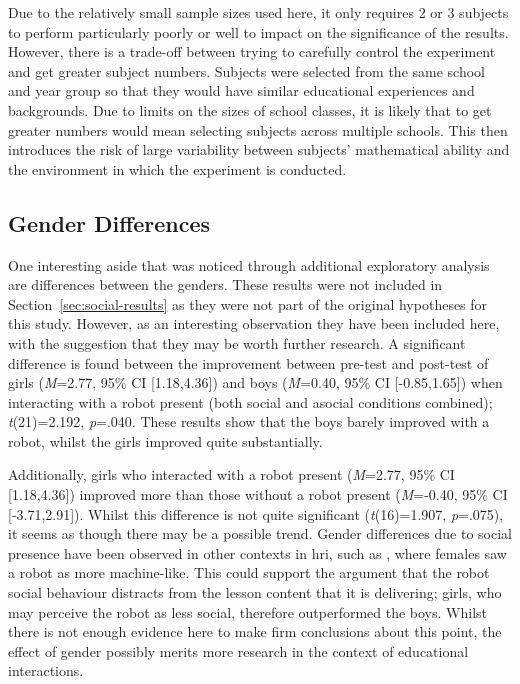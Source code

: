 Due to the relatively small sample sizes used here, it only requires 2 or 3 subjects to perform particularly poorly or well to impact on the significance of the results. However, there is a trade-off between trying to carefully control the experiment and get greater subject numbers. Subjects were selected from the same school and year group so that they would have similar educational experiences and backgrounds. Due to limits on the sizes of school classes, it is likely that to get greater numbers would mean selecting subjects across multiple schools. This then introduces the risk of large variability between subjects' mathematical ability and the environment in which the experiment is conducted.

\subsection{Gender Differences}\label{sec:disc-gender}
One interesting aside that was noticed through additional exploratory analysis are differences between the genders. These results were not included in Section~\ref{sec:social-results} as they were not part of the original hypotheses for this study. However, as an interesting observation they have been included here, with the suggestion that they may be worth further research. A significant difference is found between the improvement between pre-test and post-test of girls (\textit{M}=2.77, 95\% CI [1.18,4.36]) and boys (\textit{M}=0.40, 95\% CI [-0.85,1.65]) when interacting with a robot present (both social and asocial conditions combined); \textit{t}(21)=2.192, \textit{p}=.040. These results show that the boys barely improved with a robot, whilst the girls improved quite substantially.

Additionally, girls who interacted with a robot present (\textit{M}=2.77, 95\% CI [1.18,4.36]) improved more than those without a robot present (\textit{M}=-0.40, 95\% CI [-3.71,2.91]). Whilst this difference is not quite significant (\textit{t}(16)=1.907, \textit{p}=.075), it seems as though there may be a possible trend. Gender differences due to social presence have been observed in other contexts in \acrshort{hri}, such as \citet{schermerhorn2008robot}, where females saw a robot as more machine-like. This could support the argument that the robot social behaviour distracts from the lesson content that it is delivering; girls, who may perceive the robot as less social, therefore outperformed the boys. Whilst there is not enough evidence here to make firm conclusions about this point, the effect of gender possibly merits more research in the context of educational interactions.

